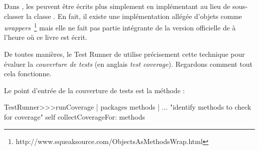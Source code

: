 \documentclass[a4paper,10pt,twoside]{book}
\begin{document}
Dans \pharo, les  peuvent être écrits plus simplement 
en implémentant  au lieu de sous-classer la classe .
En fait, il existe une implémentation allégée d'objets comme \emph{wrappers}~\footnote{http://www.squeaksource.com/ObjectsAsMethodsWrap.html} mais elle ne fait pas partie intégrante de la version officielle de \pharo à l'heure où ce livre est écrit.

De toutes manières, le Test Runner de \pharo utilise précisement cette technique pour évaluer la \emph{couverture de tests} (en anglais \emph{test coverage}).
Regardons comment tout cela fonctionne.

Le point d'entrée de la couverture de tests est la méthode :
\begin{code}{}
TestRunner>>>runCoverage
	| packages methods |
	... "identify methods to check for coverage"
	self collectCoverageFor: methods
\end{code}
\end{document}
